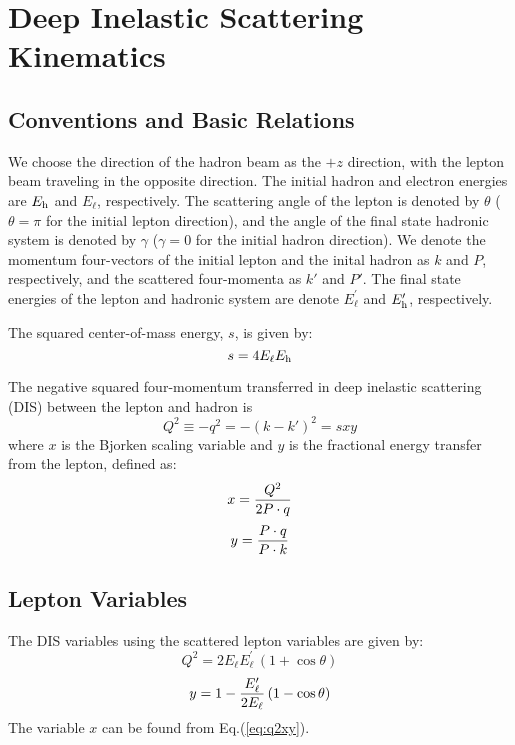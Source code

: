\documentclass[12pt]{article}
\begin{document}
\section{Deep Inelastic Scattering Kinematics}

\subsection{Conventions and Basic Relations}

We choose the direction of the hadron beam as the $+z$ direction, with
the lepton beam traveling in the opposite direction. The initial
hadron and electron energies are $E_{\rm h}$ and $E_{\ell}$,
respectively. The scattering angle of the lepton is denoted by
$\theta$ ($\theta = \pi$ for the initial lepton direction), and the angle
of the final state hadronic system is denoted by $\gamma$ ($\gamma=0$
for the initial hadron direction).
We denote the momentum four-vectors of the initial
lepton and the  inital hadron as $k$ and $P$, respectively, and the
scattered four-momenta as $k'$ and $P'$. The final state energies of
the lepton and hadronic system are denote $E^\prime_\ell$ and
$E^\prime_{\rm h}$, respectively.


The squared center-of-mass energy, ${s}$, is given by:
%
\begin{equation}
s = 4E_{\ell}E_{\rm h}
%
\end{equation}

The negative squared four-momentum transferred in deep inelastic
scattering (DIS) between the lepton and hadron is
%
\begin{equation}
Q^2 \equiv - q^2 = -(k - k')^2  = s x y
\label{eq:q2xy}
\end{equation}
%
where $x$ is the Bjorken scaling variable and $y$ is the
fractional energy transfer from the lepton, defined as:
%
\begin{equation}
  x = {Q^2 \over 2 P\cdot q} 
\end{equation}
\begin{equation}
  y = {P\cdot q \over P\cdot k}
\end{equation}
%


\subsection{Lepton Variables}

The DIS variables using the scattered lepton variables are given by:
%
\begin{equation}
Q^2 = 2 E_\ell E^\prime_\ell\, (1+ \cos \theta)
\label{eq:Q2e}
\end{equation}
\begin{equation}
y = 1 - {E^\prime_\ell \over 2 E_\ell} \, (1-\cos\theta)
\label{eq:ye}
\end{equation}
%
The variable $x$ can be found from Eq.(\ref{eq:q2xy}).
\end{document}
